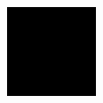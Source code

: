 \documentclass[14pt]{beamer} %
\begin{document}
\bgroup
{}
{\includegraphics[height=\paperheight,width=\paperwidth]{images/black.png}}
\begin{frame}[plain]{}
\end{frame}
\egroup

\appendix
\end{document}

